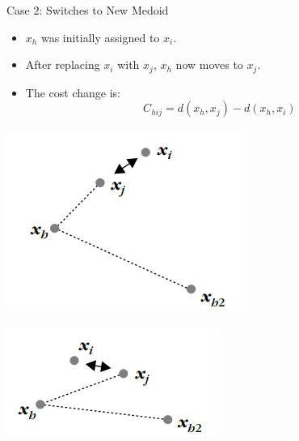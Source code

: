 \documentclass{beamer}
\begin{document}
\begin{frame}{Case 2: Switches to New Medoid}
    \begin{itemize}
        \item \(x_h\) was initially assigned to \(x_i\).
        \item After replacing \(x_i\) with \(x_j\), \(x_h\) now moves to \(x_j\).
        \item The cost change is:
        \[
        C_{hij} = d(x_h, x_j) - d(x_h, x_i)
        \]
    \end{itemize}
 \begin{center}
        \begin{minipage}{0.45\linewidth}
            \centering
            \includegraphics[width=\linewidth]{Case2.png}
        \end{minipage}
        \hfill
        \begin{minipage}{0.45\linewidth}
            \centering
            \includegraphics[width=\linewidth]{Case3.png}
        \end{minipage}
    \end{center}
\end{frame}
\end{document}
